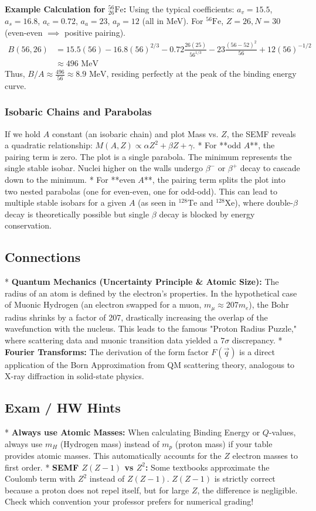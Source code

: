 \textbf{Example Calculation for $^{56}_{26}\text{Fe}$:}
Using the typical coefficients: $a_v = 15.5$, $a_s = 16.8$, $a_c = 0.72$, $a_a = 23$, $a_p = 12$ (all in MeV). For $^{56}\text{Fe}$, $Z=26, N=30$ (even-even $\implies$ positive pairing).
\begin{align*}
B(56, 26) &= 15.5(56) - 16.8(56)^{2/3} - 0.72\frac{26(25)}{56^{1/3}} - 23\frac{(56-52)^2}{56} + 12(56)^{-1/2} \\
&\approx 496 \text{ MeV}
\end{align*}
Thus, $B/A \approx \frac{496}{56} \approx 8.9 \text{ MeV}$, residing perfectly at the peak of the binding energy curve.

\subsubsection*{Isobaric Chains and Parabolas}
If we hold $A$ constant (an isobaric chain) and plot Mass vs. $Z$, the SEMF reveals a quadratic relationship: $M(A,Z) \propto \alpha Z^2 + \beta Z + \gamma$.
*   For **odd $A$**, the pairing term is zero. The plot is a single parabola. The minimum represents the single stable isobar. Nuclei higher on the walls undergo $\beta^-$ or $\beta^+$ decay to cascade down to the minimum.
*   For **even $A$**, the pairing term splits the plot into two nested parabolas (one for even-even, one for odd-odd). This can lead to multiple stable isobars for a given $A$ (as seen in $^{128}\text{Te}$ and $^{128}\text{Xe}$), where double-$\beta$ decay is theoretically possible but single $\beta$ decay is blocked by energy conservation.

\subsection*{Connections}
*   \textbf{Quantum Mechanics (Uncertainty Principle \& Atomic Size):} The radius of an atom is defined by the electron's properties. In the hypothetical case of Muonic Hydrogen (an electron swapped for a muon, $m_\mu \approx 207 m_e$), the Bohr radius shrinks by a factor of 207, drastically increasing the overlap of the wavefunction with the nucleus. This leads to the famous "Proton Radius Puzzle," where scattering data and muonic transition data yielded a $7\sigma$ discrepancy.
*   \textbf{Fourier Transforms:} The derivation of the form factor $F(\vec{q})$ is a direct application of the Born Approximation from QM scattering theory, analogous to X-ray diffraction in solid-state physics.

\subsection*{Exam / HW Hints}
*   \textbf{Always use Atomic Masses:} When calculating Binding Energy or $Q$-values, always use $m_H$ (Hydrogen mass) instead of $m_p$ (proton mass) if your table provides atomic masses. This automatically accounts for the $Z$ electron masses to first order.
*   \textbf{SEMF $Z(Z-1)$ vs $Z^2$:} Some textbooks approximate the Coulomb term with $Z^2$ instead of $Z(Z-1)$. $Z(Z-1)$ is strictly correct because a proton does not repel itself, but for large $Z$, the difference is negligible. Check which convention your professor prefers for numerical grading!